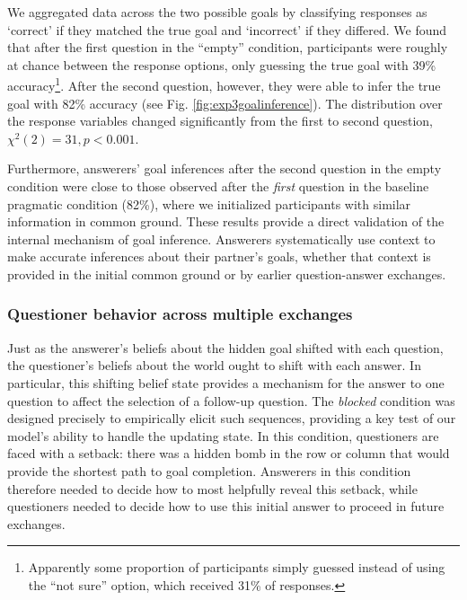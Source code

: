 \documentclass[11pt, floatsintext]{apa6}
\begin{document}
We aggregated data across the two possible goals by classifying responses as `correct' if they matched the true goal and `incorrect' if they differed.
We found that after the first question in the ``empty'' condition, participants were roughly at chance between the response options, only guessing the true goal with 39\% accuracy\footnote{Apparently some proportion of participants simply guessed instead of using the ``not sure'' option, which received 31\% of responses.}.
After the second question, however, they were able to infer the true goal with 82\% accuracy (see Fig. \ref{fig:exp3goalinference}).
The distribution over the response variables changed significantly from the first to second question, $\chi^2(2) = 31, p < 0.001$.

Furthermore, answerers' goal inferences after the second question in the empty condition were close to those observed after the \emph{first} question in the baseline pragmatic condition (82\%), where we initialized participants with similar information in common ground.
These results provide a direct validation of the internal mechanism of goal inference.
Answerers systematically use context to make accurate inferences about their partner's goals, whether that context is provided in the initial common ground or by earlier question-answer exchanges.

\subsubsection{Questioner behavior across multiple exchanges}

Just as the answerer's beliefs about the hidden goal shifted with each question, the questioner's beliefs about the world ought to shift with each answer. 
In particular, this shifting belief state provides a mechanism for the answer to one question to affect the selection of a follow-up question.
The \emph{blocked} condition was designed precisely to empirically elicit such sequences, providing a key test of our model's ability to handle the updating state.
In this condition, questioners are faced with a setback: there was a hidden bomb in the row or column that would provide the shortest path to goal completion.
Answerers in this condition therefore needed to decide how to most helpfully reveal this setback, while questioners needed to decide how to use this initial answer to proceed in future exchanges.
\end{document}
